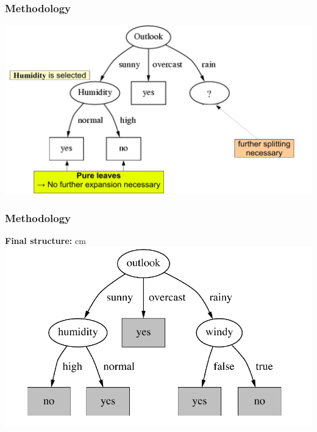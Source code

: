 \documentclass[xcolor={x11names,svgnames,dvipsnames}]{beamer}
\begin{document}
\begin{frame}
\frametitle{Methodology}


      \includegraphics[width=1\textwidth, height=0.7\textheight]{decision_tree7.png}
\end{frame}

\begin{frame}
\frametitle{Methodology}
\textbf{Final structure:}
 cm
      \includegraphics[width=1\textwidth, height=0.7\textheight]{decision_tree8.png}
\end{frame}
\end{document}
